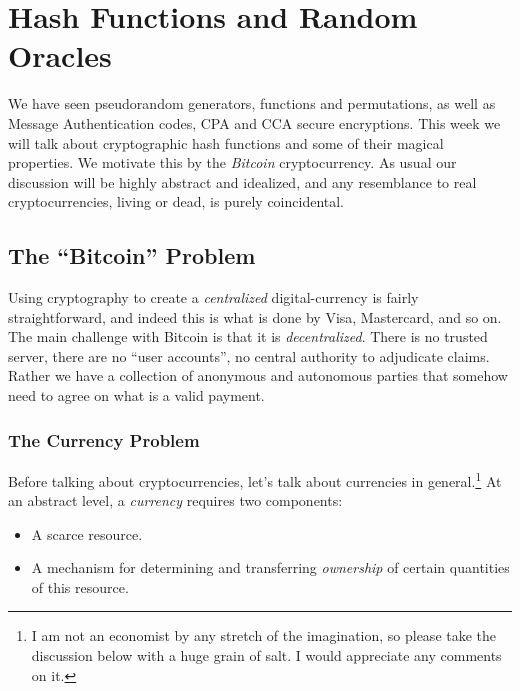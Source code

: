 \chapter{Hash Functions and Random
Oracles}\label{7-Hash-Functions-and-Ran}

We have seen pseudorandom generators, functions and permutations, as
well as Message Authentication codes, CPA and CCA secure encryptions.
This week we will talk about cryptographic hash functions and some of
their magical properties. We motivate this by the \emph{Bitcoin}
cryptocurrency. As usual our discussion will be highly abstract and
idealized, and any resemblance to real cryptocurrencies, living or dead,
is purely coincidental.

\section{The ``Bitcoin'' Problem}\label{7-The-Bitcoin-Problem}

Using cryptography to create a \emph{centralized} digital-currency is
fairly straightforward, and indeed this is what is done by Visa,
Mastercard, and so on. The main challenge with Bitcoin is that it is
\emph{decentralized}. There is no trusted server, there are no ``user
accounts'', no central authority to adjudicate claims. Rather we have a
collection of anonymous and autonomous parties that somehow need to
agree on what is a valid payment.

\subsection{The Currency Problem}\label{7-The-Currency-Problem}

Before talking about cryptocurrencies, let's talk about currencies in
general.\footnote{I am not an economist by any stretch of the
  imagination, so please take the discussion below with a huge grain of
  salt. I would appreciate any comments on it.} At an abstract level, a
\emph{currency} requires two components:

\begin{itemize}
\item
  A scarce resource.
\item
  A mechanism for determining and transferring \emph{ownership} of
  certain quantities of this resource.
\end{itemize}

